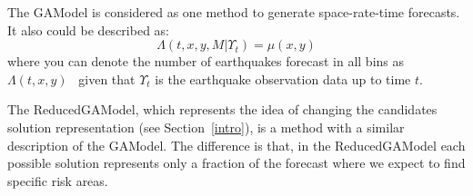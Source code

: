 %	
%
%
The GAModel is considered as one method to generate
space-rate-time forecasts. It also could be described as:
\begin{equation}\label{gamodel}
\Lambda(t,x,y,M|\Upsilon_t) = \mu(x,y)
\end{equation}
where you can denote the number of earthquakes forecast in all bins 
as $\Lambda(t,x,y)$~\cite{zechar2010evaluating} given that $\Upsilon_t$ 
is the earthquake observation data up to time $t$.

The ReducedGAModel, which represents the idea of changing the
candidates solution representation (see Section~\ref{intro}), is a
method with a similar description of the GAModel. The difference is
that, in the ReducedGAModel each possible solution represents only a
fraction of the forecast where we expect to find specific risk areas.


